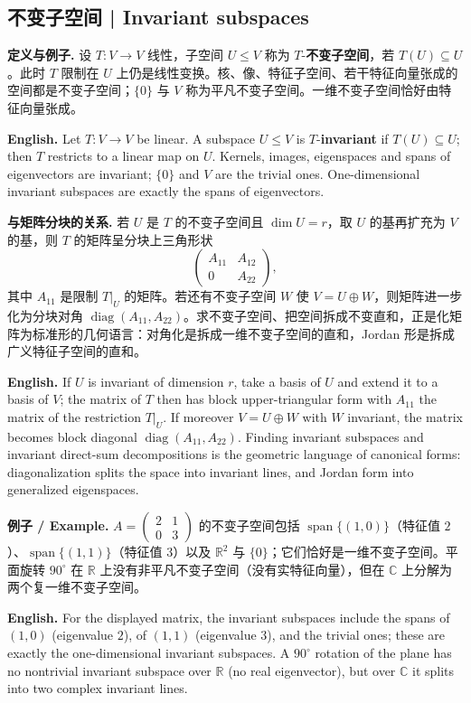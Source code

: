 \documentclass[UTF8,11pt,a4paper]{ctexart}
\newcommand{\EN}[1]{\par\noindent\textbf{English.} #1\par}
\newcommand{\EX}[2]{\par\noindent\textbf{例子 / Example.} #1\par\EN{#2}}
\begin{document}
\subsection{不变子空间 | Invariant subspaces}
\noindent\textbf{定义与例子.} 设 $T:V\to V$ 线性，子空间 $U\le V$ 称为 $T$-\textbf{不变子空间}，若 $T(U)\subseteq U$。此时 $T$ 限制在 $U$ 上仍是线性变换。核、像、特征子空间、若干特征向量张成的空间都是不变子空间；$\{0\}$ 与 $V$ 称为平凡不变子空间。一维不变子空间恰好由特征向量张成。
\EN{Let $T:V\to V$ be linear. A subspace $U\le V$ is $T$-\textbf{invariant} if $T(U)\subseteq U$; then $T$ restricts to a linear map on $U$. Kernels, images, eigenspaces and spans of eigenvectors are invariant; $\{0\}$ and $V$ are the trivial ones. One-dimensional invariant subspaces are exactly the spans of eigenvectors.}
\noindent\textbf{与矩阵分块的关系.} 若 $U$ 是 $T$ 的不变子空间且 $\dim U=r$，取 $U$ 的基再扩充为 $V$ 的基，则 $T$ 的矩阵呈分块上三角形状
\[
\begin{pmatrix}A_{11}&A_{12}\\0&A_{22}\end{pmatrix},
\]
其中 $A_{11}$ 是限制 $T|_U$ 的矩阵。若还有不变子空间 $W$ 使 $V=U\oplus W$，则矩阵进一步化为分块对角 $\operatorname{diag}(A_{11},A_{22})$。求不变子空间、把空间拆成不变直和，正是化矩阵为标准形的几何语言：对角化是拆成一维不变子空间的直和，Jordan 形是拆成广义特征子空间的直和。
\EN{If $U$ is invariant of dimension $r$, take a basis of $U$ and extend it to a basis of $V$; the matrix of $T$ then has block upper-triangular form with $A_{11}$ the matrix of the restriction $T|_U$. If moreover $V=U\oplus W$ with $W$ invariant, the matrix becomes block diagonal $\operatorname{diag}(A_{11},A_{22})$. Finding invariant subspaces and invariant direct-sum decompositions is the geometric language of canonical forms: diagonalization splits the space into invariant lines, and Jordan form into generalized eigenspaces.}
\EX{$A=\begin{pmatrix}2&1\\0&3\end{pmatrix}$ 的不变子空间包括 $\operatorname{span}\{(1,0)\}$（特征值 $2$）、$\operatorname{span}\{(1,1)\}$（特征值 $3$）以及 $\mathbb R^2$ 与 $\{0\}$；它们恰好是一维不变子空间。平面旋转 $90^\circ$ 在 $\mathbb R$ 上没有非平凡不变子空间（没有实特征向量），但在 $\mathbb C$ 上分解为两个复一维不变子空间。}{For the displayed matrix, the invariant subspaces include the spans of $(1,0)$ (eigenvalue $2$), of $(1,1)$ (eigenvalue $3$), and the trivial ones; these are exactly the one-dimensional invariant subspaces. A $90^\circ$ rotation of the plane has no nontrivial invariant subspace over $\mathbb R$ (no real eigenvector), but over $\mathbb C$ it splits into two complex invariant lines.}
\end{document}
